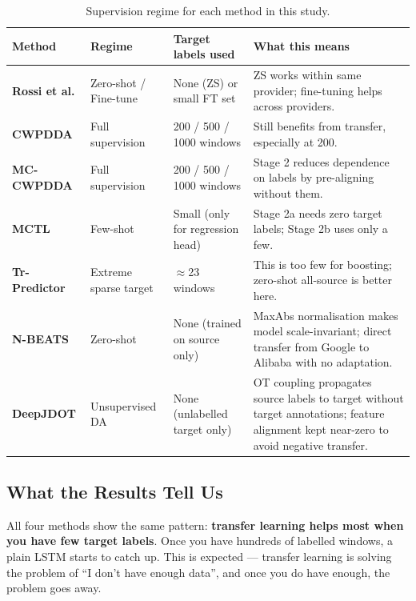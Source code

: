 \documentclass[12pt,a4paper]{article}
\begin{document}
\begin{table}[H]
\centering
\small
\caption{Supervision regime for each method in this study.}
\begin{tabular}{@{}lllp{5.5cm}@{}}
\toprule
\textbf{Method} & \textbf{Regime} & \textbf{Target labels used} & \textbf{What this means} \\
\midrule
\textcolor{rossicolor}{\textbf{Rossi et al.}} &
  Zero-shot / Fine-tune &
  None (ZS) or small FT set &
  ZS works within same provider; fine-tuning helps across providers. \\
\addlinespace
\textcolor{cwpcolor}{\textbf{CWPDDA}} &
  Full supervision &
  200 / 500 / 1000 windows &
  Still benefits from transfer, especially at 200. \\
\addlinespace
\textcolor{mccolor}{\textbf{MC-CWPDDA}} &
  Full supervision &
  200 / 500 / 1000 windows &
  Stage 2 reduces dependence on labels by pre-aligning without them. \\
\addlinespace
\textcolor{mctlcolor}{\textbf{MCTL}} &
  Few-shot &
  Small (only for regression head) &
  Stage 2a needs zero target labels; Stage 2b uses only a few. \\
\addlinespace
\textcolor{trcolor}{\textbf{Tr-Predictor}} &
  Extreme sparse target &
  $\approx$23 windows &
  This is too few for boosting; zero-shot all-source is better here. \\
\addlinespace
\textcolor{nbeatscolor}{\textbf{N-BEATS}} &
  Zero-shot &
  None (trained on source only) &
  MaxAbs normalisation makes model scale-invariant; direct transfer from Google
  to Alibaba with no adaptation. \\
\addlinespace
\textcolor{djdotcolor}{\textbf{DeepJDOT}} &
  Unsupervised DA &
  None (unlabelled target only) &
  OT coupling propagates source labels to target without target annotations;
  feature alignment kept near-zero to avoid negative transfer. \\
\bottomrule
\end{tabular}
\end{table}

\subsection{What the Results Tell Us}

All four methods show the same pattern: \textbf{transfer learning helps most
when you have few target labels}. Once you have hundreds of labelled windows,
a plain LSTM starts to catch up. This is expected --- transfer learning is
solving the problem of ``I don't have enough data'', and once you do have
enough, the problem goes away.
\end{document}
